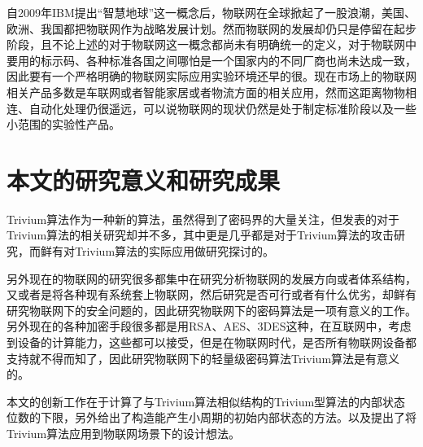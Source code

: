 自2009年IBM提出“智慧地球”这一概念后，物联网在全球掀起了一股浪潮，美国、欧洲、我国都把物联网作为战略发展计划。然而物联网的发展却仍只是停留在起步阶段，且不论上述的对于物联网这一概念都尚未有明确统一的定义，对于物联网中要用的标示码、各种标准各国之间哪怕是一个国家内的不同厂商也尚未达成一致，因此要有一个严格明确的物联网实际应用实验环境还早的很。现在市场上的物联网相关产品多数是车联网或者智能家居或者物流方面的相关应用，然而这距离物物相连、自动化处理仍很遥远，可以说物联网的现状仍然是处于制定标准阶段以及一些小范围的实验性产品。

\section{本文的研究意义和研究成果}

Trivium算法作为一种新的算法，虽然得到了密码界的大量关注，但发表的对于Trivium算法的相关研究却并不多，其中更是几乎都是对于Trivium算法的攻击研究，而鲜有对Trivium算法的实际应用做研究探讨的。

另外现在的物联网的研究很多都集中在研究分析物联网的发展方向或者体系结构，又或者是将各种现有系统套上物联网，然后研究是否可行或者有什么优劣，却鲜有研究物联网下的安全问题的，因此研究物联网下的密码算法是一项有意义的工作。另外现在的各种加密手段很多都是用RSA、AES、3DES这种，在互联网中，考虑到设备的计算能力，这些都可以接受，但是在物联网时代，是否所有物联网设备都支持就不得而知了，因此研究物联网下的轻量级密码算法Trivium算法是有意义的。

本文的创新工作在于计算了与Trivium算法相似结构的Trivium型算法的内部状态位数的下限，另外给出了构造能产生小周期的初始内部状态的方法。以及提出了将Trivium算法应用到物联网场景下的设计想法。
